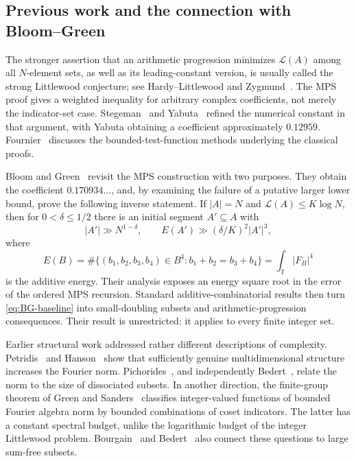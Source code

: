 \documentclass[11pt,reqno]{amsart}
\numberwithin{equation}{section}
\theoremstyle{definition}
\theoremstyle{remark}
\newcommand{\T}{\mathbb T}
\newcommand{\La}{\mathcal L}
\begin{document}
\subsection{Previous work and the connection with Bloom--Green}

The stronger assertion that an arithmetic progression minimizes $\La(A)$
among all $N$-element sets, as well as its leading-constant version, is
usually called the strong Littlewood conjecture; see Hardy--Littlewood
\cite{HardyLittlewood} and Zygmund~\cite{Zygmund}. The MPS proof gives a
weighted inequality for arbitrary complex coefficients, not merely the
indicator-set case. Stegeman~\cite{Stegeman} and Yabuta~\cite{Yabuta}
refined the numerical constant in that argument, with Yabuta obtaining a
coefficient approximately $0.12959$. Fournier~\cite{Fournier} discusses the
bounded-test-function methods underlying the classical proofs.

Bloom and Green~\cite{BG} revisit the MPS construction with two purposes.
They obtain the coefficient $0.170934\ldots$, and, by examining the
failure of a putative larger lower bound, prove the following inverse
statement. If $|A|=N$ and $\La(A)\le K\log N$, then for
$0<\delta\le1/2$ there is an initial segment $A'\subseteq A$ with
\begin{equation}\label{eq:BG-baseline}
 |A'|\gg N^{1-\delta},\qquad
 E(A')\gg(\delta/K)^2|A'|^3,
\end{equation}
where
\[
 E(B)=\#\{(b_1,b_2,b_3,b_4)\in B^4:b_1+b_2=b_3+b_4\}
     =\int_{\T}|F_B|^4
\]
is the additive energy. Their analysis exposes an energy square root in
the error of the ordered MPS recursion. Standard additive-combinatorial
results then turn \eqref{eq:BG-baseline} into small-doubling subsets and
arithmetic-progression consequences. Their result is unrestricted: it
applies to every finite integer set.

Earlier structural work addressed rather different descriptions of
complexity. Petridis~\cite{Petridis} and Hanson~\cite{Hanson} show that
sufficiently genuine multidimensional structure increases the Fourier
norm. Pichorides~\cite{Pichorides}, and independently Bedert~\cite{Bedert},
relate the norm to the size of dissociated subsets. In another direction,
the finite-group theorem of Green and Sanders~\cite{GreenSanders}
classifies integer-valued functions of bounded Fourier algebra norm by
bounded combinations of coset indicators. The latter has a constant
spectral budget, unlike the logarithmic budget of the integer
Littlewood problem. Bourgain~\cite{Bourgain} and Bedert~\cite{Bedert}
also connect these questions to large sum-free subsets.
\end{document}
